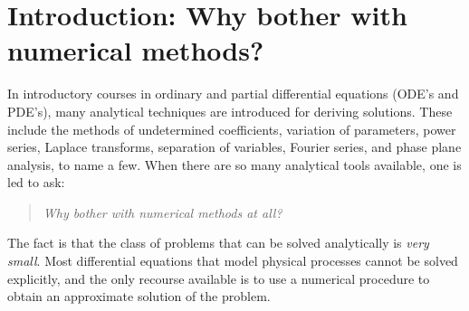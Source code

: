 % 
%
%
%
%
%
%
%
%
%
%
%
%
%
%
%

\section{Introduction: Why bother with numerical methods?}
\label{lab1:sec:intro}

In introductory courses in ordinary and partial 
differential equations (ODE's and PDE's), 
many analytical techniques are introduced for deriving solutions.
These include the methods of undetermined coefficients, variation
of parameters, power series, Laplace transforms, separation of
variables,  Fourier series, and phase plane analysis, to name a few. 
When there are so many analytical tools available, one is led to ask:

\begin{quote}
\centerline{\emph{Why bother with numerical methods at all?}}
\end{quote}

The fact is that the class of problems that can be solved
analytically is \emph{very small}.  
Most differential equations that 
model physical processes cannot be solved explicitly, and the only
recourse available is to use a numerical procedure to obtain
an approximate solution of the problem.  

